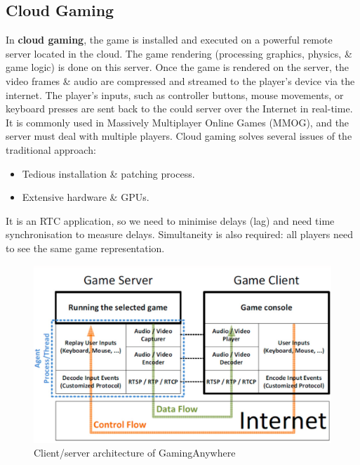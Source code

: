 \documentclass[a4paper,11pt]{article}
\begin{document}
\subsection{Cloud Gaming}
In \textbf{cloud gaming}, the game is installed and executed on a powerful remote server located in the cloud.
The game rendering (processing graphics, physics, \& game logic) is done on this server.
Once the game is rendered on the server, the video frames \& audio are compressed and streamed to the player's device via the internet.
The player's inputs, such as controller buttons, mouse movements, or keyboard presses are sent back to the could server over the Internet in real-time.
It is commonly used in Massively Multiplayer Online Games (MMOG), and the server must deal with multiple players.
Cloud gaming solves several issues of the traditional approach:
\begin{itemize}
    \item   Tedious installation \& patching process.
    \item   Extensive hardware \& GPUs.
\end{itemize}

It is an RTC application, so we need to minimise delays (lag) and need time synchronisation to measure delays.
Simultaneity is also required: all players need to see the same game representation.

\begin{figure}[H]
    \centering
    \includegraphics[width=\textwidth]{./images/cloudgaming.png}
    \caption{Client/server architecture of GamingAnywhere}
\end{figure}
\end{document}

